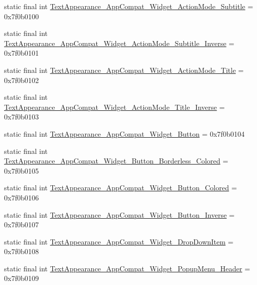 \begin{CompactItemize}
\item 
static final int \hyperlink{classandroid_1_1support_1_1graphics_1_1drawable_1_1animated_1_1_r_1_1style_37a78fa16528b5c2f17d4cdbec5d4a44}{TextAppearance\_\-AppCompat\_\-Widget\_\-ActionMode\_\-Subtitle} = 0x7f0b0100
\item 
static final int \hyperlink{classandroid_1_1support_1_1graphics_1_1drawable_1_1animated_1_1_r_1_1style_6b1a6be587f6aea8c9f7e59132592162}{TextAppearance\_\-AppCompat\_\-Widget\_\-ActionMode\_\-Subtitle\_\-Inverse} = 0x7f0b0101
\item 
static final int \hyperlink{classandroid_1_1support_1_1graphics_1_1drawable_1_1animated_1_1_r_1_1style_d31c21949a359e6ff05dd87b2b9af19c}{TextAppearance\_\-AppCompat\_\-Widget\_\-ActionMode\_\-Title} = 0x7f0b0102
\item 
static final int \hyperlink{classandroid_1_1support_1_1graphics_1_1drawable_1_1animated_1_1_r_1_1style_27397f7dd3937bf0e18132fea6f241b9}{TextAppearance\_\-AppCompat\_\-Widget\_\-ActionMode\_\-Title\_\-Inverse} = 0x7f0b0103
\item 
static final int \hyperlink{classandroid_1_1support_1_1graphics_1_1drawable_1_1animated_1_1_r_1_1style_c1f1b30624db3284429bb088e940baf6}{TextAppearance\_\-AppCompat\_\-Widget\_\-Button} = 0x7f0b0104
\item 
static final int \hyperlink{classandroid_1_1support_1_1graphics_1_1drawable_1_1animated_1_1_r_1_1style_c6b58c31edd1df9d87ecd08548fef23a}{TextAppearance\_\-AppCompat\_\-Widget\_\-Button\_\-Borderless\_\-Colored} = 0x7f0b0105
\item 
static final int \hyperlink{classandroid_1_1support_1_1graphics_1_1drawable_1_1animated_1_1_r_1_1style_8cdd11b95dae533b1cc416526d844d3e}{TextAppearance\_\-AppCompat\_\-Widget\_\-Button\_\-Colored} = 0x7f0b0106
\item 
static final int \hyperlink{classandroid_1_1support_1_1graphics_1_1drawable_1_1animated_1_1_r_1_1style_f55af20bb0778f3a86e309cffc0eaff1}{TextAppearance\_\-AppCompat\_\-Widget\_\-Button\_\-Inverse} = 0x7f0b0107
\item 
static final int \hyperlink{classandroid_1_1support_1_1graphics_1_1drawable_1_1animated_1_1_r_1_1style_1fc3d6b74ff88193893f9a4404726d5c}{TextAppearance\_\-AppCompat\_\-Widget\_\-DropDownItem} = 0x7f0b0108
\item 
static final int \hyperlink{classandroid_1_1support_1_1graphics_1_1drawable_1_1animated_1_1_r_1_1style_60840f9970061b3fe9614ebcbe27ba35}{TextAppearance\_\-AppCompat\_\-Widget\_\-PopupMenu\_\-Header} = 0x7f0b0109

\end{CompactItemize}
